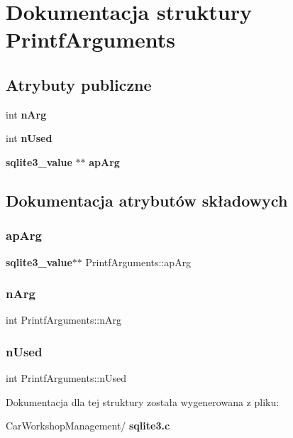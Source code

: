 \section{Dokumentacja struktury Printf\+Arguments}
\label{struct_printf_arguments}
\subsection*{Atrybuty publiczne}
\begin{DoxyCompactItemize}
\item 
int \textbf{ n\+Arg}
\item 
int \textbf{ n\+Used}
\item 
\textbf{ sqlite3\+\_\+value} $\ast$$\ast$ \textbf{ ap\+Arg}
\end{DoxyCompactItemize}


\subsection{Dokumentacja atrybutów składowych}
\mbox{\label{struct_printf_arguments_a78d20f483184bdb3c0abdeca93f1dd2d}} 
\subsubsection{apArg}
{\footnotesize\ttfamily \textbf{ sqlite3\+\_\+value}$\ast$$\ast$ Printf\+Arguments\+::ap\+Arg}

\mbox{\label{struct_printf_arguments_a8f4465ebae2de254882c3253f0f01993}} 
\subsubsection{nArg}
{\footnotesize\ttfamily int Printf\+Arguments\+::n\+Arg}

\mbox{\label{struct_printf_arguments_a686ce8f8451154f2ffd7b91cd0908327}} 
\subsubsection{nUsed}
{\footnotesize\ttfamily int Printf\+Arguments\+::n\+Used}



Dokumentacja dla tej struktury została wygenerowana z pliku\+:\begin{DoxyCompactItemize}
\item 
Car\+Workshop\+Management/\textbf{ sqlite3.\+c}\end{DoxyCompactItemize}
